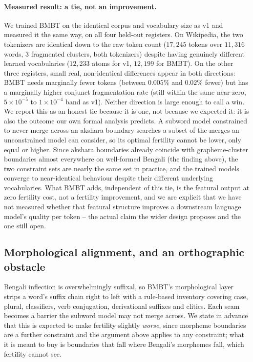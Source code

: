 \documentclass[11pt]{article}
\begin{document}
\paragraph{Measured result: a tie, not an improvement.} We trained BMBT on
the identical corpus and vocabulary size as v1 and measured it the same
way, on all four held-out registers. On Wikipedia, the two tokenizers are
identical down to the raw token count ($17{,}245$ tokens over $11{,}316$
words, $3$ fragmented clusters, both tokenizers) despite having genuinely
different learned vocabularies ($12{,}233$ atoms for v1, $12{,}199$ for
BMBT). On the other three registers, small real, non-identical differences
appear in both directions: BMBT needs marginally fewer tokens (between
$0.005\%$ and $0.02\%$ fewer) but has a marginally higher conjunct
fragmentation rate (still within the same near-zero, $5\times10^{-5}$ to
$1\times10^{-4}$ band as v1). Neither direction is large enough to call a
win. We report this as an honest tie because it is one, not because we
expected it: it is also the outcome our own formal analysis predicts. A
subword model constrained to never merge across an akshara boundary
searches a subset of the merges an unconstrained model can consider, so its
optimal fertility cannot be lower, only equal or higher. Since akshara
boundaries already coincide with grapheme-cluster boundaries almost
everywhere on well-formed Bengali (the finding above), the two constraint
sets are nearly the same set in practice, and the trained models converge
to near-identical behaviour despite their different underlying vocabularies.
What BMBT adds, independent of this tie, is the featural output at zero
fertility cost, not a fertility improvement, and we are explicit that we
have not measured whether that featural structure improves a downstream
language model's quality per token -- the actual claim the wider design
proposes and the one still open.

\subsection{Morphological alignment, and an orthographic obstacle}
\label{sec:morphology}

Bengali inflection is overwhelmingly suffixal, so BMBT's morphological layer
strips a word's suffix chain right to left with a rule-based inventory
covering case, plural, classifiers, verb conjugation, derivational suffixes
and clitics. Each seam becomes a barrier the subword model may not merge
across. We state in advance that this is expected to make fertility slightly
\emph{worse}, since morpheme boundaries are a further constraint and the
argument above applies to any constraint; what it is meant to buy is
boundaries that fall where Bengali's morphemes fall, which fertility cannot
see.
\end{document}

